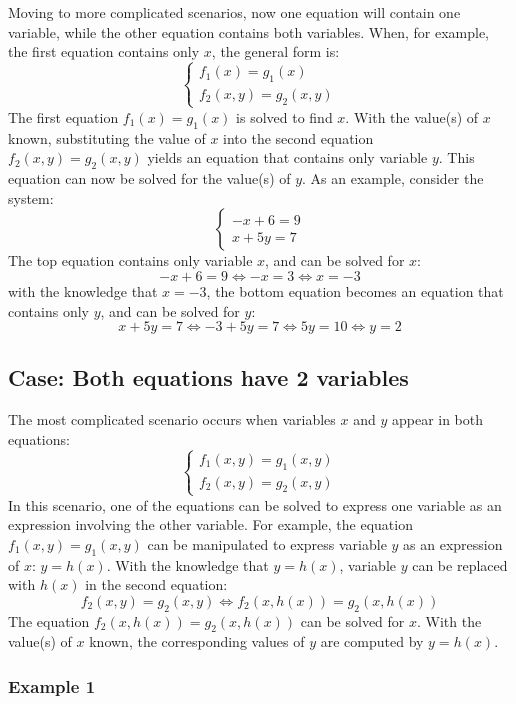 \documentclass{article}
\begin{document}
Moving to more complicated scenarios, now one equation will contain one variable, while the other equation contains both variables. When, for example, the first equation contains only \(x\), the general form is:
\[\left\{\begin{array}{c} f_1(x) = g_1(x) \\ f_2(x,y) = g_2(x,y) \end{array}\right.\]
The first equation \(f_1(x) = g_1(x)\) is solved to find \(x\). With the value(s) of \(x\) known, substituting the value of \(x\) into the second equation \(f_2(x,y) = g_2(x,y)\) yields an equation that contains only variable \(y\). This equation can now be solved for the value(s) of \(y\). As an example, consider the system:
\[\left\{\begin{array}{c}
-x + 6 = 9 \\
x + 5y = 7
\end{array}\right.\]
The top equation contains only variable \(x\), and can be solved for \(x\):
\[-x + 6 = 9 \iff -x = 3 \iff x = -3\]
with the knowledge that \(x = -3\), the bottom equation becomes an equation that contains only \(y\), and can be solved for \(y\):
\[x + 5y = 7 \iff -3 + 5y = 7 \iff 5y = 10 \iff y = 2\]



\subsection*{Case: Both equations have 2 variables}

The most complicated scenario occurs when variables \(x\) and \(y\) appear in both equations:
\[\left\{\begin{array}{c} f_1(x,y) = g_1(x,y) \\ f_2(x,y) = g_2(x,y) \end{array}\right.\]
In this scenario, one of the equations can be solved to express one variable as an expression involving the other variable. For example, the equation \(f_1(x,y) = g_1(x,y)\) can be manipulated to express variable \(y\) as an expression of \(x\): \(y = h(x)\). With the knowledge that \(y = h(x)\), variable \(y\) can be replaced with \(h(x)\) in the second equation:
\[f_2(x,y) = g_2(x,y) \iff f_2(x,h(x)) = g_2(x,h(x))\]
The equation \(f_2(x,h(x)) = g_2(x,h(x))\) can be solved for \(x\). With the value(s) of \(x\) known, the corresponding values of \(y\) are computed by \(y = h(x)\).


\subsubsection*{Example 1}
\end{document}
